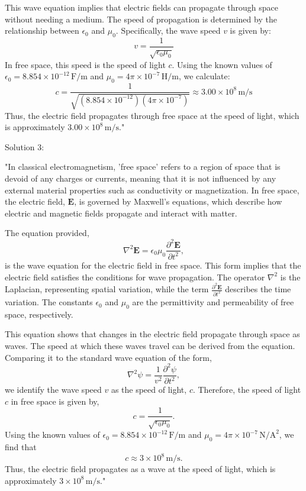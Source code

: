 This wave equation implies that electric fields can propagate through space without needing a medium. The speed of propagation is determined by the relationship between $\epsilon_0$ and $\mu_0$. Specifically, the wave speed $v$ is given by:
\[
v = \frac{1}{\sqrt{\epsilon_0 \mu_0}}
\]
In free space, this speed is the speed of light $c$. Using the known values of $\epsilon_0 = 8.854 \times 10^{-12} \, \mathrm{F/m}$ and $\mu_0 = 4\pi \times 10^{-7} \, \mathrm{H/m}$, we calculate:
\[
c = \frac{1}{\sqrt{(8.854 \times 10^{-12})(4\pi \times 10^{-7})}} \approx 3.00 \times 10^8 \, \mathrm{m/s}
\]
Thus, the electric field propagates through free space at the speed of light, which is approximately $3.00 \times 10^8 \, \mathrm{m/s}$."

Solution 3: 

"In classical electromagnetism, 'free space' refers to a region of space that is devoid of any charges or currents, meaning that it is not influenced by any external material properties such as conductivity or magnetization. In free space, the electric field, $\mathbf{E}$, is governed by Maxwell's equations, which describe how electric and magnetic fields propagate and interact with matter.

The equation provided,
\[
\nabla^2 \mathbf{E} = \epsilon_0 \mu_0 \frac{\partial^2 \mathbf{E}}{\partial t^2},
\]
is the wave equation for the electric field in free space. This form implies that the electric field satisfies the conditions for wave propagation. The operator $\nabla^2$ is the Laplacian, representing spatial variation, while the term $\frac{\partial^2 \mathbf{E}}{\partial t^2}$ describes the time variation. The constants $\epsilon_0$ and $\mu_0$ are the permittivity and permeability of free space, respectively.

This equation shows that changes in the electric field propagate through space as waves. The speed at which these waves travel can be derived from the equation. Comparing it to the standard wave equation of the form,
\[
\nabla^2 \psi = \frac{1}{v^2} \frac{\partial^2 \psi}{\partial t^2},
\]
we identify the wave speed $v$ as the speed of light, $c$. Therefore, the speed of light $c$ in free space is given by,
\[
c = \frac{1}{\sqrt{\epsilon_0 \mu_0}}.
\]
Using the known values of $\epsilon_0 = 8.854 \times 10^{-12} \, \text{F/m}$ and $\mu_0 = 4\pi \times 10^{-7} \, \text{N/A}^2$, we find that
\[
c \approx 3 \times 10^8 \, \text{m/s}.
\]
Thus, the electric field propagates as a wave at the speed of light, which is approximately $3 \times 10^8 \, \text{m/s}$."


